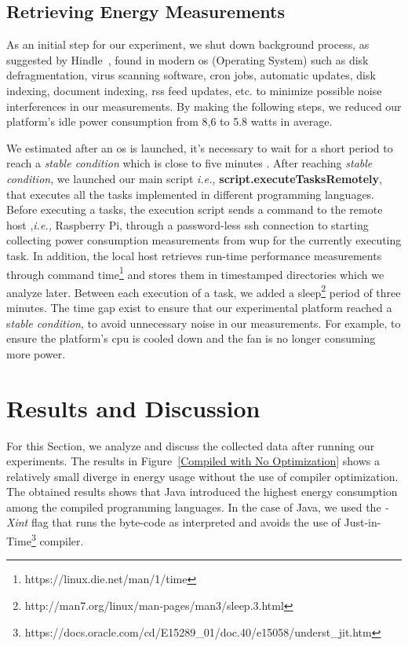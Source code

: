 \subsection{Retrieving Energy Measurements} 
As an initial step for our experiment, we shut down background 
process, as suggested by Hindle~, 
found in modern {\sc os} (Operating System) such as disk defragmentation, virus 
scanning software, {\sc cron} jobs, automatic updates, 
disk indexing, document indexing, {\sc rss} feed updates, etc. to 
minimize possible noise interferences in our measurements. 
By making the following steps, we reduced our platform's idle 
power consumption from 8,6 to 5.8 watts in average. 


We estimated after an {\sc os} is launched, 
it's necessary to wait for a short period to reach a 
\textit{stable condition} which is close to five minutes \cite{carroll_analysis_2010}.
After reaching \textit{stable condition}, we launched our main 
script \textit{i.e.,} \textbf{script.executeTasksRemotely}, 
that executes all the tasks implemented in different programming 
languages. 
Before executing a tasks, the execution script sends a command 
to the remote host ,\textit{i.e.,} Raspberry Pi, through a 
password-less {\sc ssh} connection to starting 
collecting power consumption measurements from {\sc wup} 
for the currently executing task. 
In addition, the local host retrieves run-time performance 
measurements through command 
time\footnote{https://linux.die.net/man/1/time} and stores them 
in timestamped directories which we analyze later.
Between each execution of a task, we added a 
sleep\footnote{http://man7.org/linux/man-pages/man3/sleep.3.html} 
period of three minutes. 
The time gap exist to ensure that our experimental platform 
reached a s\textit{table condition}, to avoid unnecessary noise 
in our measurements. 
For example, to ensure the platform's {\sc cpu} is cooled down 
and the fan is no longer consuming more power.

\section{Results and Discussion} \label{results_and_discussion}
For this Section, we analyze and discuss the collected data after 
running our experiments. 
The results in Figure~\ref{Compiled with No Optimization} shows 
a relatively small diverge in energy usage without the use of 
compiler optimization. 
The obtained results shows that Java introduced the highest 
energy consumption among the compiled programming languages. 
In the case of Java, we used the \textit{-Xint} flag that runs 
the byte-code as interpreted and avoids the use of 
Just-in-Time\footnote{https://docs.oracle.com/cd/E15289\_01/doc.40/e15058/underst\_jit.htm} 
compiler.

